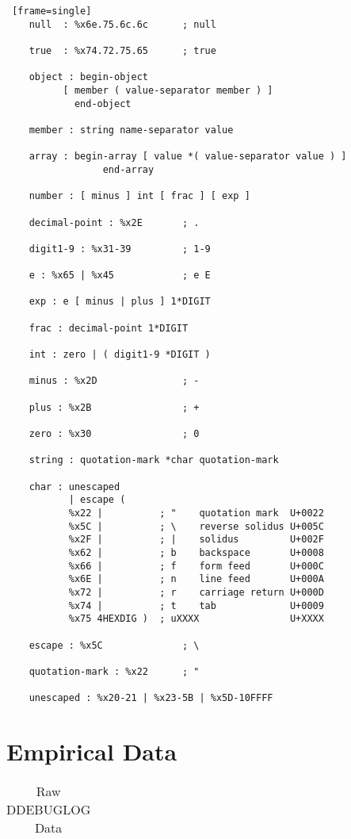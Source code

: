 \begin{appendices}
\begin{Verbatim} [frame=single]
	null  : %x6e.75.6c.6c      ; null

	true  : %x74.72.75.65      ; true

	object : begin-object
	      [ member ( value-separator member ) ]
			end-object

	member : string name-separator value

	array : begin-array [ value *( value-separator value ) ]
				 end-array

	number : [ minus ] int [ frac ] [ exp ]

	decimal-point : %x2E       ; .

	digit1-9 : %x31-39         ; 1-9

	e : %x65 | %x45            ; e E

	exp : e [ minus | plus ] 1*DIGIT

	frac : decimal-point 1*DIGIT

	int : zero | ( digit1-9 *DIGIT )

	minus : %x2D               ; -

	plus : %x2B                ; +

	zero : %x30                ; 0

	string : quotation-mark *char quotation-mark

	char : unescaped 
		   | escape (
		   %x22 |          ; "    quotation mark  U+0022
		   %x5C |          ; \    reverse solidus U+005C
		   %x2F |          ; |    solidus         U+002F
		   %x62 |          ; b    backspace       U+0008
		   %x66 |          ; f    form feed       U+000C
		   %x6E |          ; n    line feed       U+000A
		   %x72 |          ; r    carriage return U+000D
		   %x74 |          ; t    tab             U+0009
		   %x75 4HEXDIG )  ; uXXXX                U+XXXX

	escape : %x5C              ; \

	quotation-mark : %x22      ; "

	unescaped : %x20-21 | %x23-5B | %x5D-10FFFF
\end{Verbatim}


\chapter{Empirical Data}

\begin{center}
\begin{longtable}{|l|l|l|}
\caption[Raw DDEBUGLOG Data]{Raw DDEBUGLOG Data} \label{grid_mlmmh} \\


\end{longtable}
\end{center}
\end{appendices}
